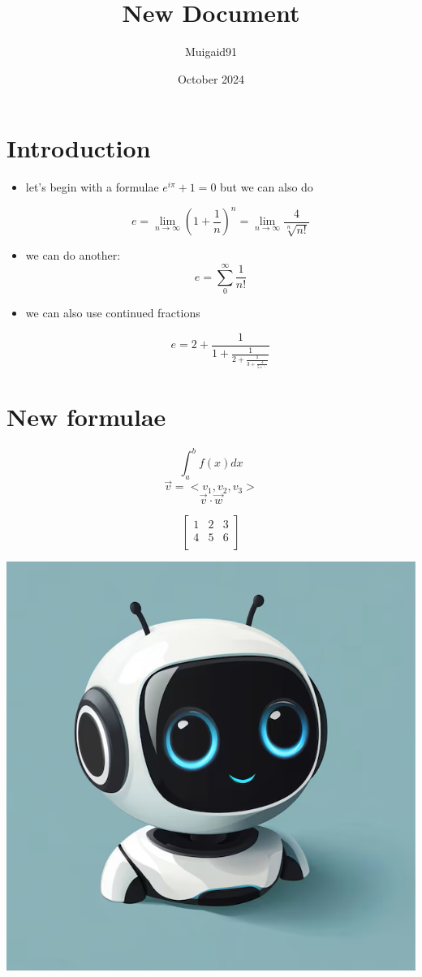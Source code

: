 \documentclass[12pt]{article}
\title{New Document} %
\author{Muigaid91} %
\date{October 2024}
\begin{document}
	\justifying %
	
	\maketitle
	
	\section*{Introduction}
	
	\begin{itemize}
		\item let's begin with a formulae $e^{i\pi}+1=0$ but we can also do   
		
		$$e=\lim_{n\to\infty}\left(1 + \frac{1}{n}\right)^n = \lim_{n\to\infty}\frac{4}{\sqrt[n]{n!}}$$
		
		\item we can do another:
		$$e=\sum_{0}^{\infty}\frac{1}{n!}$$
		
		\item we can also use continued fractions 
		
		$$e=2+\frac{1}{1+\frac{1}{2+\frac{1}{3+\frac{3}{5+ \ddots}}}}$$
	\end{itemize}
	
	\section*{New formulae }
	$$\int_a^bf(x)dx$$
	$$\vec{v}=<v_1, v_2, v_3>$$
	$$\vec{v}\cdot \vec{w}$$
	
	$$
	\begin{bmatrix}
		1 & 2 & 3 \\
		4 & 5 & 6 \\
	\end{bmatrix}
	$$
	
	\includegraphics[scale=0.3]{bot1.png}
	
\end{document}
